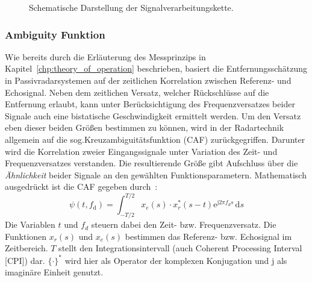 \begin{figure}[htb]
    \caption{Schematische Darstellung der Signalverarbeitungskette.}\label{fig:signal_processing_chain}
\end{figure}

\subsubsection{Ambiguity Funktion}\label{sct:ambiguity_function}

Wie bereits durch die Erläuterung des Messprinzips in Kapitel~\ref{chp:theory_of_operation} beschrieben, basiert die Entfernungsschätzung in Passivradarsystemen auf der zeitlichen Korrelation zwischen Referenz- und Echosignal. Neben dem zeitlichen Versatz, welcher Rückschlüsse auf die Entfernung erlaubt, kann unter Berücksichtigung des Frequenzversatzes beider Signale auch eine bistatische Geschwindigkeit ermittelt werden. Um den Versatz eben dieser beiden Größen bestimmen zu können, wird in der Radartechnik allgemein auf die sog.\@ Kreuzambiguitätsfunktion (CAF) zurückgegriffen. Darunter wird die Korrelation zweier Eingangssignale unter Variation des Zeit- und Frequenzversatzes verstanden. Die resultierende Größe gibt Aufschluss über die \emph{Ähnlichkeit} beider Signale an den gewählten Funktionsparametern. Mathematisch ausgedrückt ist die CAF gegeben durch~\cite[S.~132]{Malanowski2019}:%
%
\begin{equation}\label{equ:cross_ambiguity_function}
    \psi(t, f_{\text{d}}) = \int_{-T/2}^{T/2} {x_{e}(s) \cdot x_{r}^{*}} \left( s - t \right)\mathrm{e}^{\mathrm{j} 2 \pi f_{d} s} \, \text{d} s
\end{equation}%
%
Die Variablen \(t\) und \(f_{d}\) steuern dabei den Zeit- bzw. Frequenzversatz. Die Funktionen \(x_{r}(s)\) und \(x_{e}(s)\) bestimmen das Referenz- bzw. Echosignal im Zeitbereich. \(T\) stellt den Integrationsintervall (auch Coherent Processing Interval [CPI]) dar. \({\{}\cdot{\}}^{*}\) wird hier als Operator der komplexen Konjugation und \(\mathrm{j}\) als imaginäre Einheit genutzt.

